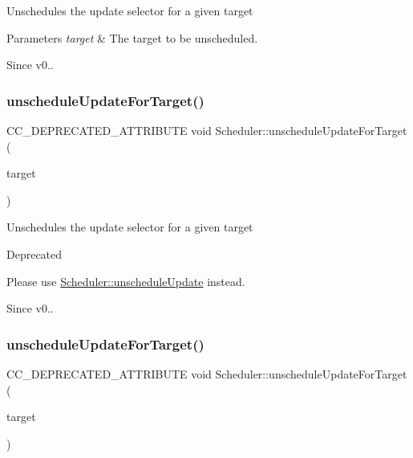 Unschedules the update selector for a given target 
\begin{DoxyParams}{Parameters}
{\em target} & The target to be unscheduled. \\
\hline
\end{DoxyParams}
\begin{DoxySince}{Since}
v0.. 
\end{DoxySince}
\mbox{\label{classScheduler_ac5ba32d69e94ebe72d58cbd661782ca6}} 
\subsubsection{\texorpdfstring{unschedule\+Update\+For\+Target()}{unscheduleUpdateForTarget()}\hspace{0.1cm}{\footnotesize\ttfamily [1/2]}}
{\footnotesize\ttfamily C\+C\+\_\+\+D\+E\+P\+R\+E\+C\+A\+T\+E\+D\+\_\+\+A\+T\+T\+R\+I\+B\+U\+TE void Scheduler\+::unschedule\+Update\+For\+Target (\begin{DoxyParamCaption}\item[{\hyperlink{classRef}{Ref} $\ast$}]{target }\end{DoxyParamCaption})\hspace{0.3cm}{\ttfamily [inline]}}

Unschedules the update selector for a given target \begin{DoxyRefDesc}{Deprecated}
\item[\hyperlink{deprecated__deprecated000059}{Deprecated}]Please use \textquotesingle{}\hyperlink{classScheduler_acc7bc87cc441a0f826c2a6758a9adcad}{Scheduler\+::unschedule\+Update}\textquotesingle{} instead. \end{DoxyRefDesc}
\begin{DoxySince}{Since}
v0.. 
\end{DoxySince}
\mbox{\label{classScheduler_ac5ba32d69e94ebe72d58cbd661782ca6}} 
\subsubsection{\texorpdfstring{unschedule\+Update\+For\+Target()}{unscheduleUpdateForTarget()}\hspace{0.1cm}{\footnotesize\ttfamily [2/2]}}
{\footnotesize\ttfamily C\+C\+\_\+\+D\+E\+P\+R\+E\+C\+A\+T\+E\+D\+\_\+\+A\+T\+T\+R\+I\+B\+U\+TE void Scheduler\+::unschedule\+Update\+For\+Target (\begin{DoxyParamCaption}\item[{\hyperlink{classRef}{Ref} $\ast$}]{target }\end{DoxyParamCaption})\hspace{0.3cm}{\ttfamily [inline]}}

